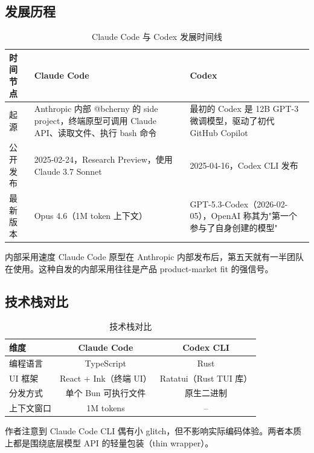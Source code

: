 \documentclass[a4paper]{article}
\begin{document}
\subsection{发展历程}

\begin{table}[H]
\centering
\caption{Claude Code 与 Codex 发展时间线}
\begin{tabular}{lp{5.5cm}p{5.5cm}}
\toprule
\textbf{时间节点} & \textbf{Claude Code} & \textbf{Codex} \\
\midrule
起源 & Anthropic 内部 @bcherny 的 side project，终端原型可调用 Claude API、读取文件、执行 bash 命令 & 最初的 Codex 是 12B GPT-3 微调模型，驱动了初代 GitHub Copilot \\
\addlinespace
公开发布 & 2025-02-24，Research Preview，使用 Claude 3.7 Sonnet & 2025-04-16，Codex CLI 发布 \\
\addlinespace
最新版本 & Opus 4.6（1M token 上下文） & GPT-5.3-Codex（2026-02-05），OpenAI 称其为"第一个参与了自身创建的模型" \\
\bottomrule
\end{tabular}
\end{table}

\begin{knowledgebox}{内部采用速度}
Claude Code 原型在 Anthropic 内部发布后，第五天就有一半团队在使用。这种自发的内部采用往往是产品 product-market fit 的强信号。
\end{knowledgebox}

\subsection{技术栈对比}

\begin{table}[H]
\centering
\caption{技术栈对比}
\begin{tabular}{lcc}
\toprule
\textbf{维度} & \textbf{Claude Code} & \textbf{Codex CLI} \\
\midrule
编程语言 & TypeScript & Rust \\
UI 框架 & React + Ink（终端 UI） & Ratatui（Rust TUI 库） \\
分发方式 & 单个 Bun 可执行文件 & 原生二进制 \\
上下文窗口 & 1M tokens & -- \\
\bottomrule
\end{tabular}
\end{table}

作者注意到 Claude Code CLI 偶有小 glitch，但不影响实际编码体验。两者本质上都是围绕底层模型 API 的轻量包装（thin wrapper）。
\end{document}
